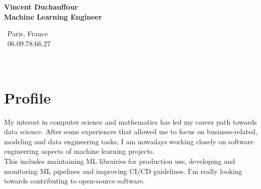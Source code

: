 \documentclass[a4paper,10pt]{article}
\begin{document}
\thispagestyle{empty}


\begin{adjustbox}{valign=t}
    \begin{minipage}{0.3\textwidth}
        \begin{center}
            {\Large \bfseries Vincent Duchauffour}\\
            {\large \bfseries Machine Learning Engineer}\\[1cm]
            \raggedright
            \vspace{-.5cm}
            \faHome~Paris, France\\
            \faPhone~06.09.78.66.27\\
            \textcolor{ColorTwo}{\faEnvelopeO}
            \\
            \textcolor{ColorTwo}{\faLinkedin}
            \\
            \textcolor{ColorTwo}{\faGithub}
        \end{center}
        \vspace{-.5cm}
        \section*{Profile}
        \justifying 
        My interest in computer science and mathematics has led my career path towards data science. After some experiences that allowed me to focus on business-related, modeling and data engineering tasks, I am nowadays working closely on software engineering aspects of machine learning projects.\\ This includes maintaining ML librairies for production use, developing and monitoring ML pipelines and improving CI/CD guidelines. I'm really looking towards contributing to open-source software.
        \vspace{-.5cm}

\end{minipage}
\end{adjustbox}
\end{document}
